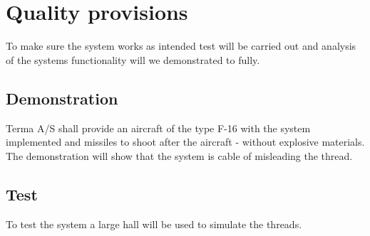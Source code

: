 \documentclass[Main]{subfiles}
\begin{document}
\chapter{Quality provisions}

To make sure the system works as intended test will be carried out and analysis of the systems functionality will we demonstrated to fully.


\section{Demonstration}
Terma A/S shall provide an aircraft of the type F-16 with the system implemented and missiles to shoot after the aircraft - without explosive materials. 
The demonstration will show that the system is cable of misleading the thread.

\section{Test}
To test the system a large hall will be used to simulate the threads.
\end{document}

